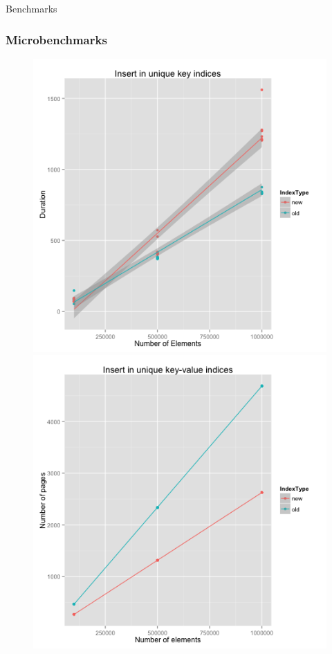 \documentclass{beamer}
\begin{document}
  \begin{section}{Benchmarks}
    \begin{frame}
      \frametitle{Microbenchmarks}
      \begin{figure}
        \includegraphics[scale=0.3]{images/unique_random_insert.png}
        \quad
        \includegraphics[scale=0.3]{images/nonUnique_random_insert_nodes.png}

\end{figure}
\end{frame}
\end{section}
\end{document}
